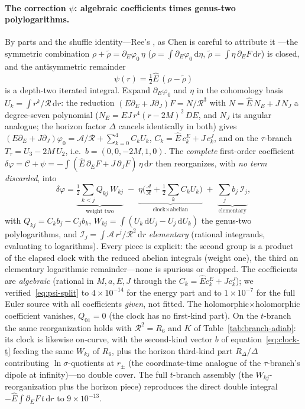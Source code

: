 \documentclass[12pt]{iopart}
\theoremstyle{plain}
\theoremstyle{definition}
\theoremstyle{remark}
\newcommand{\Ehat}{\hat E}
\newcommand{\dd}{\mathrm{d}}
\begin{document}
\paragraph{The correction $\psi$: algebraic coefficients times genus-two
polylogarithms.} By parts and the shuffle identity---Ree's \cite{Ree1958}, as Chen is careful to
attribute it \cite[\S1.1]{Chen1977}---the symmetric
combination $\rho+\tilde\rho=\partial_E\varphi_0\,\eta$
($\rho=\int\partial_E\varphi_0\,\dd\eta$,
$\tilde\rho=\int\eta\,\partial_E F\,\dd r$) is closed, and the antisymmetric
remainder
\begin{equation}
    \psi(r)=\tfrac12\Ehat\,(\rho-\tilde\rho)
    \label{eq:psi-irr}
\end{equation}
is a depth-two iterated integral. Expand $\partial_E\varphi_0$ and $\eta$ in the
cohomology basis $U_k=\int r^k/\mathcal{R}\,\dd r$: the reduction
$(E\partial_E+J\partial_J)F=N/\mathcal{R}^3$ with $N=\Ehat\,N_E+J\,N_J$ a degree-seven
polynomial ($N_E=EJ\,r^4(r-2M)^2\,DE$, and $N_J$ its angular analogue; the horizon
factor $\Delta$ cancels identically in both) gives
$(E\partial_E+J\partial_J)\varphi_0=\mathcal{A}/\mathcal{R}+\sum_{k=0}^{4} C_k U_k$,
$C_k=\Ehat\,c_k^{E}+J\,c_k^{J}$, and on the
$\tau$-branch $T_\tau=U_3-2M\,U_2$, i.e.\ $b=(0,0,-2M,1,0)$. The \emph{complete}
first-order coefficient $\delta\varphi=\mathcal{C}+\psi=-\!\int(\Ehat\,\partial_E F
+J\,\partial_J F)\,\eta\,\dd r$ then reorganizes, with \emph{no term discarded}, into
\begin{equation}
    \delta\varphi=
    \underbrace{\tfrac12\!\sum_{k<j}Q_{kj}\,W_{kj}}_{\text{weight two}}
    \;-\;\underbrace{\eta\Big(\tfrac{\mathcal{A}}{\mathcal{R}}
    +\tfrac12\!\sum_k C_k U_k\Big)}_{\text{clock}\times\text{abelian}}
    \;+\;\underbrace{\sum_j b_j\,\mathcal{I}_j}_{\text{elementary}},
    \label{eq:psi-split}
\end{equation}
with $Q_{kj}=C_k b_j-C_j b_k$, $W_{kj}=\int(U_k\,\dd U_j-U_j\,\dd U_k)$ the
genus-two polylogarithms, and $\mathcal{I}_j=\int\mathcal{A}\,r^j/\mathcal{R}^2\,
\dd r$ \emph{elementary} (rational integrands, evaluating to logarithms). Every
piece is explicit: the second group is a product of the elapsed clock with the
reduced abelian integrals (weight one), the third an elementary logarithmic
remainder---none is spurious or dropped. The coefficients are \emph{algebraic}
(rational in $M,a,E,J$ through the $C_k=\Ehat c_k^E+J c_k^J$); we
verified~\eqref{eq:psi-split} to $4\times10^{-14}$ for the energy part and to
$1\times10^{-7}$ for the full Euler source with all coefficients \emph{given}, not
fitted. The
holomorphic$\times$holomorphic coefficient vanishes, $Q_{01}=0$ (the clock has no
first-kind part). On the $t$-branch the same reorganization holds with
$\mathcal{R}^2=R_6$ and $K$ of Table~\ref{tab:branch-adiab}: its clock is likewise
on-curve, with the second-kind vector $b$ of equation~\eqref{eq:clock-t} feeding the same
$W_{kj}$ of $R_6$, plus the horizon third-kind part $R_\Delta/\Delta$ contributing
$\ln\sigma$-quotients at $r_\pm$ (the coordinate-time analogue of the $\tau$-branch's
dipole at infinity)---no double cover. The full $t$-branch assembly (the
$W_{kj}$-reorganization plus the horizon piece) reproduces the direct double integral
$-\Ehat\!\int\!\partial_E F\,t\,\dd r$ to $9\times10^{-13}$.
\end{document}
